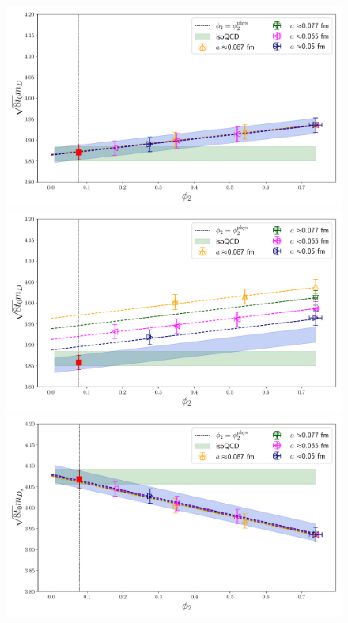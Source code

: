  \begin{figure}[!t]
 	\centering
 	\includegraphics[scale=0.3]{./cap6/figs/matching/fit_phi2_mD_fl_ave.pdf}
 	\includegraphics[scale=0.3]{./cap6/figs/matching/fit_phi2_mD_etac.pdf}
 	\\
 	\includegraphics[scale=0.3]{./cap6/figs/matching/fit_phi2_mDs_fl_ave.pdf}

\end{figure}

